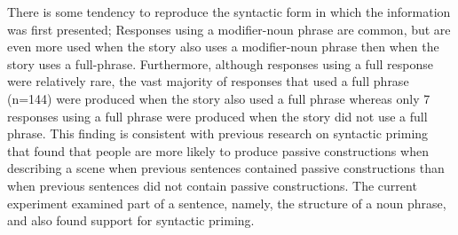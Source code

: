 \documentclass[output=paper]{langsci/langscibook}
\begin{document}
There is some tendency to reproduce the syntactic form in which the
information was first presented; Responses using a modifier-noun
phrase are common, but are even more used when the story also uses a
modifier-noun phrase then when the story uses a full-phrase.
Furthermore, although responses using a full response were relatively
rare, the vast majority of responses that used a full phrase (n=144)
were produced when the story also used a full phrase whereas only 7
responses using a full phrase were produced when the story did not use
a full phrase. This finding is consistent with previous research on
syntactic priming \citep{bock1986syntactic,bock1990framing} that found that
people are more likely to produce passive constructions when
describing a scene when previous sentences contained passive
constructions than when previous sentences did not contain passive
constructions. The current experiment examined part of a sentence,
namely, the structure of a noun phrase, and also found support for
syntactic priming.
\end{document}
